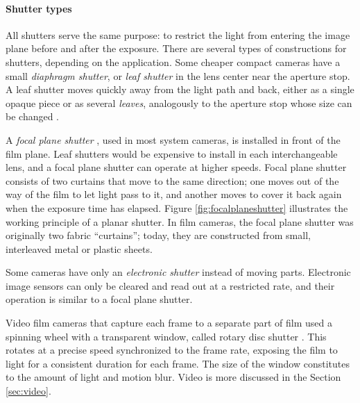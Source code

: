 \paragraph{Shutter types}
All shutters serve the same purpose: to restrict the light from entering the image plane before and after the exposure.
There are several types of constructions for shutters, depending on the application.
Some cheaper compact cameras have a small \emph{diaphragm shutter}, or \emph{leaf shutter} in the lens center near the aperture stop.
A leaf shutter moves quickly away from the light path and back, either as a single opaque piece or as several \emph{leaves}, analogously to the aperture stop whose size can be changed \cite{greenleaf1950photographic}.

A \emph{focal plane shutter} \cite{greenleaf1950photographic}, used in most system cameras, is installed in front of the film plane.
Leaf shutters would be expensive to install in each interchangeable lens, and a focal plane shutter can operate at higher speeds.
Focal plane shutter consists of two curtains that move to the same direction; one moves out of the way of the film to let light pass to it, and another moves to cover it back again when the exposure time has elapsed.
Figure \ref{fig:focalplaneshutter} illustrates the working principle of a planar shutter.
In film cameras, the focal plane shutter was originally two fabric ``curtains'';
today, they are constructed from small, interleaved metal or plastic sheets.

Some cameras have only an \emph{electronic shutter} instead of moving parts.
Electronic image sensors can only be cleared and read out at a restricted rate, and their operation is similar to a focal plane shutter.
\cite{caspeelectronic,kodakshutter}

Video film cameras that capture each frame to a separate part of film used a spinning wheel with a transparent window, called rotary disc shutter \cite{wilson2004anton}.
This rotates at a precise speed synchronized to the frame rate, exposing the film to light for a consistent duration for each frame.
The size of the window constitutes to the amount of light and motion blur.
Video is more discussed in the Section \ref{sec:video}.


